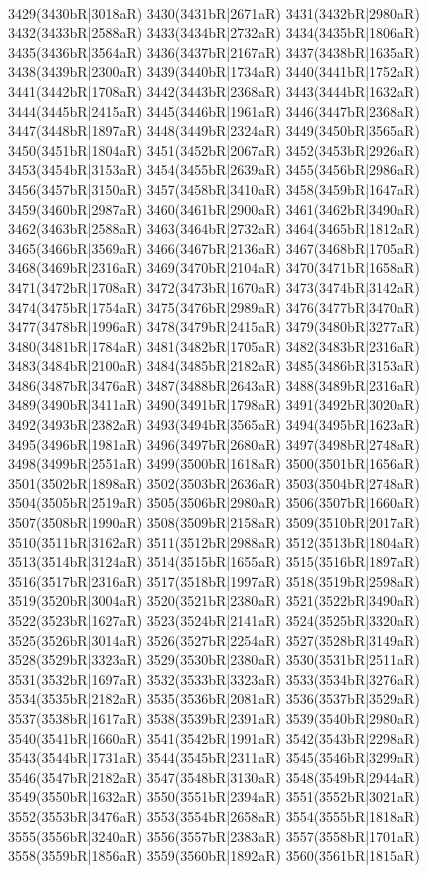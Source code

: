 \\3429(3430bR|3018aR) 3430(3431bR|2671aR) 3431(3432bR|2980aR) 3432(3433bR|2588aR) 3433(3434bR|2732aR) 3434(3435bR|1806aR) 3435(3436bR|3564aR) 3436(3437bR|2167aR) 3437(3438bR|1635aR) \\3438(3439bR|2300aR) 3439(3440bR|1734aR) 3440(3441bR|1752aR) 3441(3442bR|1708aR) 3442(3443bR|2368aR) 3443(3444bR|1632aR) 3444(3445bR|2415aR) 3445(3446bR|1961aR) 3446(3447bR|2368aR) \\3447(3448bR|1897aR) 3448(3449bR|2324aR) 3449(3450bR|3565aR) 3450(3451bR|1804aR) 3451(3452bR|2067aR) 3452(3453bR|2926aR) 3453(3454bR|3153aR) 3454(3455bR|2639aR) 3455(3456bR|2986aR) \\3456(3457bR|3150aR) 3457(3458bR|3410aR) 3458(3459bR|1647aR) 3459(3460bR|2987aR) 3460(3461bR|2900aR) 3461(3462bR|3490aR) 3462(3463bR|2588aR) 3463(3464bR|2732aR) 3464(3465bR|1812aR) \\3465(3466bR|3569aR) 3466(3467bR|2136aR) 3467(3468bR|1705aR) 3468(3469bR|2316aR) 3469(3470bR|2104aR) 3470(3471bR|1658aR) 3471(3472bR|1708aR) 3472(3473bR|1670aR) 3473(3474bR|3142aR) \\3474(3475bR|1754aR) 3475(3476bR|2989aR) 3476(3477bR|3470aR) 3477(3478bR|1996aR) 3478(3479bR|2415aR) 3479(3480bR|3277aR) 3480(3481bR|1784aR) 3481(3482bR|1705aR) 3482(3483bR|2316aR) \\3483(3484bR|2100aR) 3484(3485bR|2182aR) 3485(3486bR|3153aR) 3486(3487bR|3476aR) 3487(3488bR|2643aR) 3488(3489bR|2316aR) 3489(3490bR|3411aR) 3490(3491bR|1798aR) 3491(3492bR|3020aR) \\3492(3493bR|2382aR) 3493(3494bR|3565aR) 3494(3495bR|1623aR) 3495(3496bR|1981aR) 3496(3497bR|2680aR) 3497(3498bR|2748aR) 3498(3499bR|2551aR) 3499(3500bR|1618aR) 3500(3501bR|1656aR) \\3501(3502bR|1898aR) 3502(3503bR|2636aR) 3503(3504bR|2748aR) 3504(3505bR|2519aR) 3505(3506bR|2980aR) 3506(3507bR|1660aR) 3507(3508bR|1990aR) 3508(3509bR|2158aR) 3509(3510bR|2017aR) \\3510(3511bR|3162aR) 3511(3512bR|2988aR) 3512(3513bR|1804aR) 3513(3514bR|3124aR) 3514(3515bR|1655aR) 3515(3516bR|1897aR) 3516(3517bR|2316aR) 3517(3518bR|1997aR) 3518(3519bR|2598aR) \\3519(3520bR|3004aR) 3520(3521bR|2380aR) 3521(3522bR|3490aR) 3522(3523bR|1627aR) 3523(3524bR|2141aR) 3524(3525bR|3320aR) 3525(3526bR|3014aR) 3526(3527bR|2254aR) 3527(3528bR|3149aR) \\3528(3529bR|3323aR) 3529(3530bR|2380aR) 3530(3531bR|2511aR) 3531(3532bR|1697aR) 3532(3533bR|3323aR) 3533(3534bR|3276aR) 3534(3535bR|2182aR) 3535(3536bR|2081aR) 3536(3537bR|3529aR) \\3537(3538bR|1617aR) 3538(3539bR|2391aR) 3539(3540bR|2980aR) 3540(3541bR|1660aR) 3541(3542bR|1991aR) 3542(3543bR|2298aR) 3543(3544bR|1731aR) 3544(3545bR|2311aR) 3545(3546bR|3299aR) \\3546(3547bR|2182aR) 3547(3548bR|3130aR) 3548(3549bR|2944aR) 3549(3550bR|1632aR) 3550(3551bR|2394aR) 3551(3552bR|3021aR) 3552(3553bR|3476aR) 3553(3554bR|2658aR) 3554(3555bR|1818aR) \\3555(3556bR|3240aR) 3556(3557bR|2383aR) 3557(3558bR|1701aR) 3558(3559bR|1856aR) 3559(3560bR|1892aR) 3560(3561bR|1815aR) 